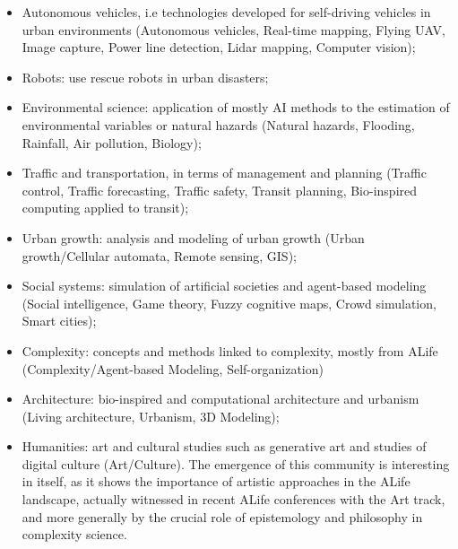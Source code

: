 \documentclass[10pt]{article}
\begin{document}
\begin{itemize}
	\item Autonomous vehicles, i.e technologies developed for self-driving vehicles in urban environments (Autonomous vehicles, Real-time mapping, Flying UAV, Image capture, Power line detection, Lidar mapping, Computer vision);
	\item Robots: use rescue robots in urban disasters;
	\item Environmental science: application of mostly AI methods to the estimation of environmental variables or natural hazards (Natural hazards, Flooding, Rainfall, Air pollution, Biology);
	\item Traffic and transportation, in terms of management and planning (Traffic control, Traffic forecasting, Traffic safety, Transit planning, Bio-inspired computing applied to transit);
	\item Urban growth: analysis and modeling of urban growth (Urban growth/Cellular automata, Remote sensing, GIS);
	\item Social systems: simulation of artificial societies and agent-based modeling (Social intelligence, Game theory, Fuzzy cognitive maps, Crowd simulation, Smart cities);
	\item Complexity: concepts and methods linked to complexity, mostly from ALife (Complexity/Agent-based Modeling, Self-organization)
	\item Architecture: bio-inspired and computational architecture and urbanism (Living architecture, Urbanism, 3D Modeling);
	\item Humanities: art and cultural studies such as generative art and studies of digital culture (Art/Culture). The emergence of this community is interesting in itself, as it shows the importance of artistic approaches in the ALife landscape, actually witnessed in recent ALife conferences with the Art track, and more generally by the crucial role of epistemology and philosophy in complexity science.
\end{itemize}
\end{document}
